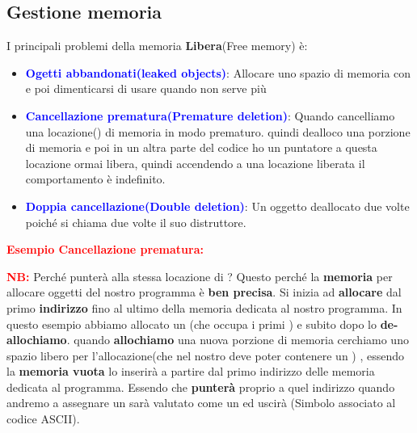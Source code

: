 \subsection{Gestione memoria}
I principali problemi della memoria \textbf{Libera}(Free memory) è:
\begin{itemize}
    \item \textbf{\textcolor{blue}{Ogetti abbandonati(leaked objects)}}: Allocare uno spazio di memoria con \textcolor{blue}{} e poi dimenticarsi di usare \textcolor{blue}{} quando non serve più
    \item \textbf{\textcolor{blue}{Cancellazione prematura(Premature deletion)}}: Quando cancelliamo una locazione() di memoria in modo prematuro. quindi dealloco una porzione di memoria e poi in un altra parte del codice ho un puntatore a questa locazione ormai libera, quindi accendendo a una locazione liberata il comportamento è indefinito.
    \item \textbf{\textcolor{blue}{Doppia cancellazione(Double deletion)}}: Un oggetto deallocato due volte poiché si chiama due volte il suo distruttore.
    
\end{itemize}

\begin{tcolorbox}[width=15cm, boxsep=10pt]
    \textbf{\textcolor{red}{Esempio Cancellazione prematura:}}
    
    \textcolor{red}{\textbf{NB:}} Perché \textcolor{blue}{} punterà alla stessa locazione di \textcolor{blue}{} ? Questo perché la \textbf{memoria} per allocare oggetti del nostro programma è \textbf{ben precisa}. Si inizia ad \textbf{allocare} dal primo \textbf{indirizzo} fino al ultimo della memoria dedicata al nostro programma. In questo esempio abbiamo allocato un \textcolor{blue}{}(che occupa i primi ) e subito dopo lo \textbf{de-allochiamo}. quando \textbf{allochiamo} una nuova porzione di memoria cerchiamo uno spazio libero per l'allocazione(che nel nostro deve poter contenere un \textcolor{blue}{}) , essendo la \textbf{memoria vuota} lo inserirà a partire dal primo indirizzo delle memoria dedicata al programma. Essendo che \textbf{punterà} proprio a quel indirizzo quando andremo a assegnare un  sarà valutato come un \textcolor{blue}{} ed uscirà (Simbolo associato al codice ASCII).
\end{tcolorbox}
